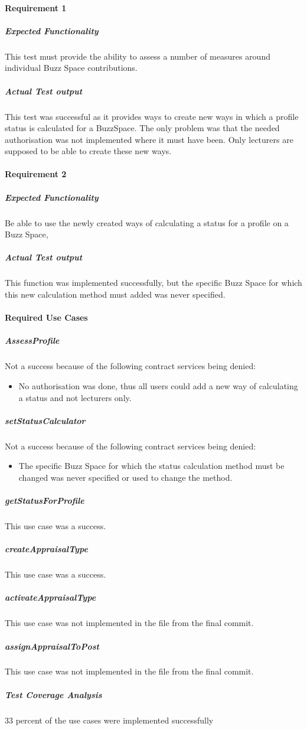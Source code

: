 
\paragraph{Requirement 1}
	\subparagraph{Expected Functionality}
	This test must provide the ability to assess a number of measures around individual Buzz Space contributions.
	
	\subparagraph{Actual Test output}
	This test was successful as it provides ways to create new ways in which a profile status is calculated for a BuzzSpace. The only problem was that the needed 			authorisation was not implemented where it must have been. Only lecturers are supposed to be able to create these new ways. 
		

\paragraph{Requirement 2}
	\subparagraph{Expected Functionality}
	Be able to use the newly created ways of calculating a status for a profile on a Buzz Space,
	
	\subparagraph{Actual Test output}
	This function was implemented successfully,  but the specific Buzz Space for which this new calculation method must  added was never specified.

\paragraph{Required Use Cases}
	\subparagraph{AssessProfile}
	Not a success because of the following contract services being denied:
	\begin{itemize}
			\item No authorisation was done, thus all users could add a new way of calculating a status and not lecturers only.
	\end{itemize}

	\subparagraph{setStatusCalculator}
	Not a success because of the following contract services being denied:
	\begin{itemize}
			\item The specific Buzz Space for which the status calculation method must be changed was never specified or used to change the method. 
	\end{itemize}	

	\subparagraph{getStatusForProfile}
	This use case was a success.
	
	\subparagraph{createAppraisalType}
	This use case was a success.
	
	\subparagraph{activateAppraisalType}
	This use case was not implemented in the file from the final commit.

	\subparagraph{assignAppraisalToPost}
	This use case was not implemented in the file from the final commit.

	\subparagraph{Test Coverage Analysis}
	33 percent of the use cases were implemented successfully

	

